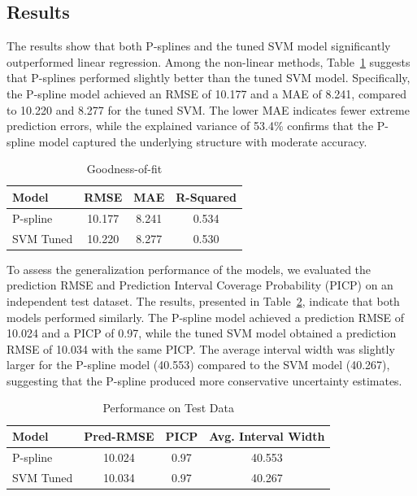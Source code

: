 \documentclass[8pt,twocolumn]{article}
\begin{document}
\subsection{Results}

The results show that both P-splines and the tuned SVM model significantly outperformed linear regression. Among the non-linear methods, Table~\ref{tab:train} suggests that P-splines performed slightly better than the tuned SVM model. Specifically, the P-spline model achieved an RMSE of 10.177 and a MAE of 8.241, compared to 10.220 and 8.277 for the tuned SVM. The lower MAE indicates fewer extreme prediction errors, while the explained variance of 53.4\% confirms that the P-spline model captured the underlying structure with moderate accuracy.


\begin{table}[ht]
  \centering
  \caption{Goodness-of-fit}
  \label{tab:train}
  \setlength{\tabcolsep}{4pt}
  \begin{tabular}{@{}lccc@{}}
    \toprule
    Model & RMSE & MAE & R-Squared \\
    \midrule
    P-spline & 10.177 & 8.241 & 0.534 \\
    SVM Tuned & 10.220 & 8.277 & 0.530 \\
    \bottomrule
  \end{tabular}
\end{table}

To assess the generalization performance of the models, we evaluated the prediction RMSE and Prediction Interval Coverage Probability (PICP) on an independent test dataset. The results, presented in Table~\ref{tab:test}, indicate that both models performed similarly. The P-spline model achieved a prediction RMSE of 10.024 and a PICP of 0.97, while the tuned SVM model obtained a prediction RMSE of 10.034 with the same PICP. The average interval width was slightly larger for the P-spline model (40.553) compared to the SVM model (40.267), suggesting that the P-spline produced more conservative uncertainty estimates.

\begin{table}[ht]
  \centering
  \caption{Performance on Test Data}
  \label{tab:test}
  \setlength{\tabcolsep}{4pt}
  \begin{tabular}{@{}lccc@{}}
    \toprule
    Model & Pred-RMSE & PICP & Avg. Interval Width \\
    \midrule
    P-spline & 10.024 & 0.97 & 40.553 \\
    SVM Tuned & 10.034 & 0.97 & 40.267 \\
    \bottomrule
  \end{tabular}
\end{table}
\end{document}
